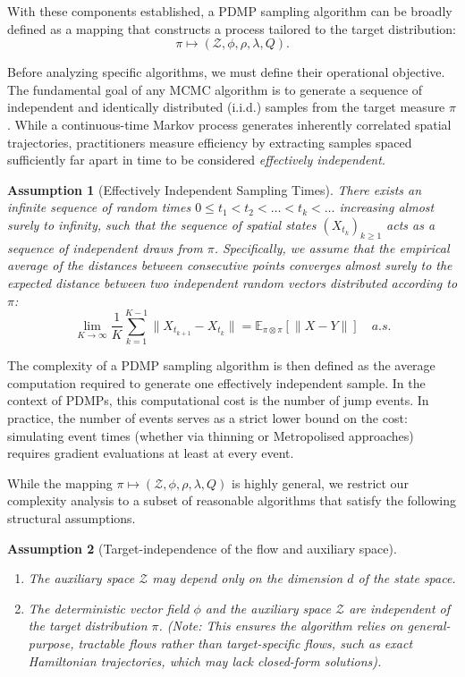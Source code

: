 \documentclass{article}
\newtheorem{assumption}{Assumption}
\begin{document}
With these components established, a PDMP sampling algorithm can be broadly defined as a mapping that constructs a process tailored to the target distribution:
\[
    \pi \mapsto (\mathcal{Z},\phi,\rho, \lambda, Q).
\]

Before analyzing specific algorithms, we must define their operational objective. The fundamental goal of any MCMC algorithm is to generate a sequence of independent and identically distributed (i.i.d.) samples from the target measure $\pi$. While a continuous-time Markov process generates inherently correlated spatial trajectories, practitioners measure efficiency by extracting samples spaced sufficiently far apart in time to be considered \textit{effectively independent}. 

\begin{assumption}[Effectively Independent Sampling Times]
    \label{assum:independent_times}
    There exists an infinite sequence of random times $0 \leq t_1 < t_2 < \dots < t_k < \dots$ increasing almost surely to infinity, such that the sequence of spatial states $(X_{t_k})_{k \geq 1}$ acts as a sequence of independent draws from $\pi$. Specifically, we assume that the empirical average of the distances between consecutive points converges almost surely to the expected distance between two independent random vectors distributed according to $\pi$:
    \[
        \lim_{K \to \infty} \frac{1}{K} \sum_{k=1}^{K-1} \|X_{t_{k+1}} - X_{t_k}\| = \mathbb{E}_{\pi \otimes \pi}[\|X - Y\|] \quad a.s.
    \]
\end{assumption}

The complexity of a PDMP sampling algorithm is then defined as the average computation required to generate one effectively independent sample. In the context of PDMPs, this computational cost is the number of jump events. In practice, the number of events serves as a strict lower bound on the cost: simulating event times (whether via thinning or Metropolised approaches) requires gradient evaluations at least at every event.

While the mapping $\pi \mapsto (\mathcal{Z},\phi,\rho, \lambda, Q)$ is highly general, we restrict our complexity analysis to a subset of reasonable algorithms that satisfy the following structural assumptions.

\begin{assumption}[Target-independence of the flow and auxiliary space]
\begin{enumerate}
    \item The auxiliary space $\mathcal{Z}$ may depend only on the dimension $d$ of the state space. 
    \item The deterministic vector field $\phi$ and the auxiliary space $\mathcal{Z}$ are independent of the target distribution $\pi$. 
    (Note: This ensures the algorithm relies on general-purpose, tractable flows rather than target-specific flows, such as exact Hamiltonian trajectories, which may lack closed-form solutions).
\end{enumerate}
\end{assumption}
\end{document}
